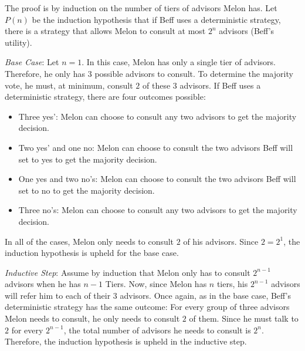 \documentclass[12pt,twoside]{article}
\begin{document}
\begin{problems}
\begin{problemparts}
\begin{itemize}
\end{itemize}

\end{problemparts}

\newpage
\problem  %

\begin{problemparts}

\problempart %

The proof is by induction on the number of tiers of advisors Melon has. Let
$P(n)$ be the induction hypothesis that if Beff uses a deterministic
strategy, there is a strategy that allows Melon to consult at most $2^n$
advisors (Beff's utility).

{\it Base Case}: Let $n = 1$. In this case, Melon has only a single tier of
advisors. Therefore, he only has $3$ possible advisors to consult. To
determine the majority vote, he must, at minimum, consult $2$ of these $3$
advisors. If Beff uses a deterministic strategy, there are four outcomes
possible:

\begin{itemize}
  \item Three yes': Melon can choose to consult any two advisors to get the
  majority decision.
  \item Two yes' and one no: Melon can choose to consult the two advisors
  Beff will set to yes to get the majority decision.
  \item One yes and two no's: Melon can choose to consult the two advisors
  Beff will set to no to get the majority decision.
  \item Three no's: Melon can choose to consult any two advisors to get the
  majority decision.
\end{itemize}

In all of the cases, Melon only needs to consult $2$ of his advisors. Since
$2 = 2^1$, the induction hypothesis is upheld for the base case.

{\it Inductive Step}: Assume by induction that Melon only has to consult
$2^{n - 1}$ advisors when he has $n - 1$ Tiers. Now, since Melon has $n$
tiers, his $2^{n - 1}$ advisors will refer him to each of their $3$ advisors.
Once again, as in the base case, Beff's deterministic strategy has the same
outcome: For every group of three advisors Melon needs to consult, he only
needs to consult $2$ of them. Since he must talk to $2$ for every $2^{n -
1}$, the total number of advisors he needs to consult is $2^n$. Therefore,
the induction hypothesis is upheld in the inductive step.


\end{problemparts}
\end{problems}
\end{document}
